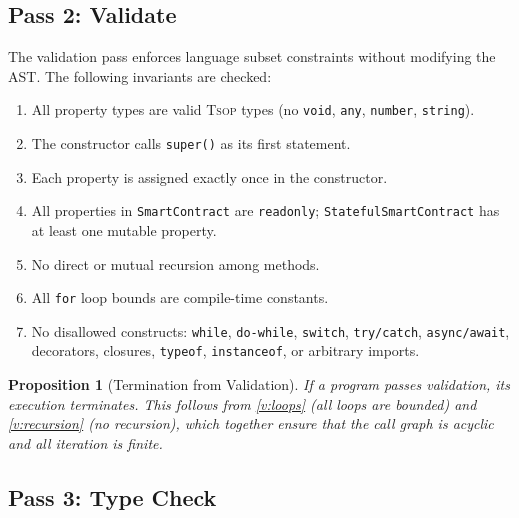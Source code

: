 \documentclass[11pt,a4paper]{article}
\newtheorem{proposition}[theorem]{Proposition}
\newcommand{\tsop}{\textsc{Tsop}}
\begin{document}
\subsection{Pass 2: Validate}
\label{sec:pass-validate}

The validation pass enforces language subset constraints without modifying
the AST. The following invariants are checked:

\begin{enumerate}[label=\textbf{V\arabic*}., ref=V\arabic*]
  \item \label{v:types} All property types are valid \tsop{} types (no
    \texttt{void}, \texttt{any}, \texttt{number}, \texttt{string}).
  \item \label{v:super} The constructor calls \texttt{super()} as its first
    statement.
  \item \label{v:assign} Each property is assigned exactly once in the
    constructor.
  \item \label{v:readonly} All properties in \texttt{SmartContract} are
    \texttt{readonly}; \texttt{StatefulSmartContract} has at least one
    mutable property.
  \item \label{v:recursion} No direct or mutual recursion among methods.
  \item \label{v:loops} All \texttt{for} loop bounds are compile-time
    constants.
  \item \label{v:subset} No disallowed constructs: \texttt{while},
    \texttt{do-while}, \texttt{switch}, \texttt{try/catch},
    \texttt{async/await}, decorators, closures, \texttt{typeof},
    \texttt{instanceof}, or arbitrary imports.
\end{enumerate}

\begin{proposition}[Termination from Validation]
\label{prop:termination}
If a program passes validation, its execution terminates. This follows from
\ref{v:loops} (all loops are bounded) and \ref{v:recursion} (no recursion),
which together ensure that the call graph is acyclic and all iteration is
finite.
\end{proposition}

\subsection{Pass 3: Type Check}
\label{sec:pass-typecheck}
\end{document}
